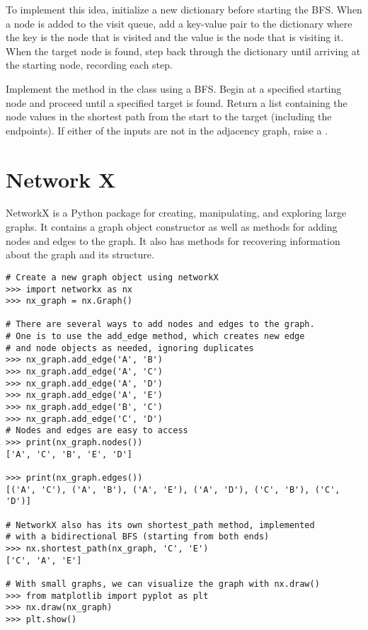 To implement this idea, initialize a new dictionary before starting the BFS.
When a node is added to the visit queue, add a key-value pair to the dictionary where the key is the node that is visited and the value is the node that is visiting it.
When the target node is found, step back through the dictionary until arriving at the starting node, recording each step.

\begin{problem}
Implement the  method in the  class using a BFS.
Begin at a specified starting node and proceed until a specified target is found.
Return a list containing the node values in the shortest path from the start to the target (including the endpoints).
If either of the inputs are not in the adjacency graph, raise a .
\end{problem}

\section*{Network X}

NetworkX is a Python package for creating, manipulating, and exploring large graphs.
It contains a graph object constructor as well as methods for adding nodes and edges to the graph.
It also has methods for recovering information about the graph and its structure.

\begin{lstlisting}
# Create a new graph object using networkX
>>> import networkx as nx
>>> nx_graph = nx.Graph()

# There are several ways to add nodes and edges to the graph.
# One is to use the add_edge method, which creates new edge
# and node objects as needed, ignoring duplicates
>>> nx_graph.add_edge('A', 'B')
>>> nx_graph.add_edge('A', 'C')
>>> nx_graph.add_edge('A', 'D')
>>> nx_graph.add_edge('A', 'E')
>>> nx_graph.add_edge('B', 'C')
>>> nx_graph.add_edge('C', 'D')
# Nodes and edges are easy to access
>>> print(nx_graph.nodes())
['A', 'C', 'B', 'E', 'D']

>>> print(nx_graph.edges())
[('A', 'C'), ('A', 'B'), ('A', 'E'), ('A', 'D'), ('C', 'B'), ('C', 'D')]

# NetworkX also has its own shortest_path method, implemented
# with a bidirectional BFS (starting from both ends)
>>> nx.shortest_path(nx_graph, 'C', 'E')
['C', 'A', 'E']

# With small graphs, we can visualize the graph with nx.draw()
>>> from matplotlib import pyplot as plt
>>> nx.draw(nx_graph)
>>> plt.show()
\end{lstlisting}

